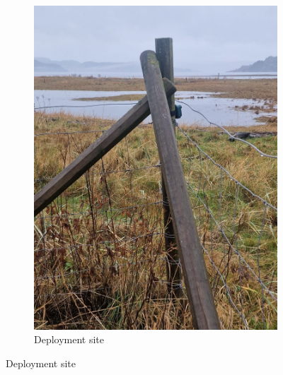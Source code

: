 \documentclass[twocolumn]{article}
\begin{document}
\begin{figure}[H]
\begin{subfigure}{0.48\columnwidth}
\includegraphics[width=\textwidth]{03_deployment_location_fence.jpg}
\caption{Deployment site}
\end{subfigure}


\end{figure}
\end{document}
